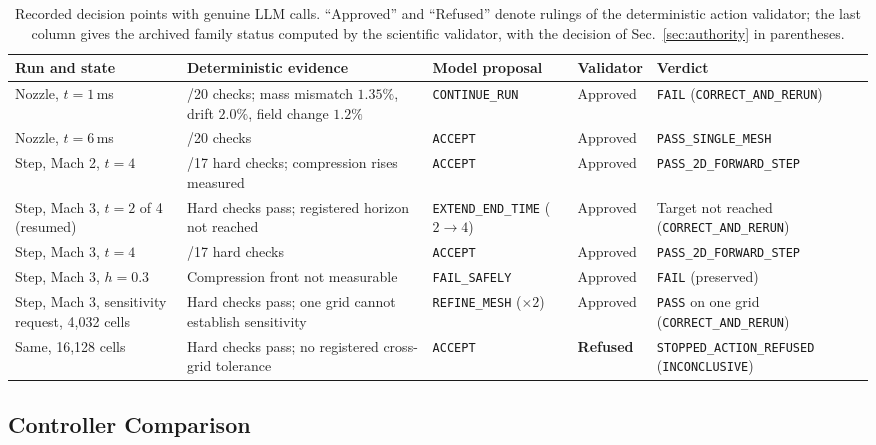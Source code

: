 \documentclass[11pt]{article}
\begin{document}
\begin{table}[!htbp]
\centering
\caption{Recorded decision points with genuine LLM calls.
``Approved'' and ``Refused'' denote rulings of the
deterministic action validator; the last column gives the archived family status computed
by the scientific validator, with the decision of Sec.~\ref{sec:authority}
in parentheses.}
\label{tab:actions}
\footnotesize
\setlength{\tabcolsep}{3pt}
\begin{tabularx}{\linewidth}{@{}>{\raggedright\arraybackslash}p{2.2cm}
  >{\raggedright\arraybackslash}X >{\raggedright\arraybackslash}p{2.55cm}
  >{\raggedright\arraybackslash}p{1.45cm} >{\raggedright\arraybackslash}p{3.3cm}@{}}
\toprule
Run and state & Deterministic evidence & Model proposal & Validator & Verdict \\
\midrule
Nozzle, $t=1$\,ms & 17/20 checks; mass mismatch $1.35\%$, drift $2.0\%$, field change $1.2\%$ & \texttt{CONTINUE\_RUN} & Approved & \texttt{FAIL} (\texttt{CORRECT\_AND\_\allowbreak RERUN}) \\
Nozzle, $t=6$\,ms & 20/20 checks & \texttt{ACCEPT} & Approved & \texttt{PASS\_SINGLE\_MESH} \\
Step, Mach 2, $t=4$ & 17/17 hard checks; compression rises measured & \texttt{ACCEPT} & Approved & \texttt{PASS\_2D\_FORWARD\_STEP} \\
Step, Mach 3, $t=2$ of 4 (resumed) & Hard checks pass; registered horizon not reached & \texttt{EXTEND\_END\_TIME} ($2\to4$) & Approved & Target not reached (\texttt{CORRECT\_AND\_\allowbreak RERUN}) \\
Step, Mach 3, $t=4$ & 17/17 hard checks & \texttt{ACCEPT} & Approved & \texttt{PASS\_2D\_FORWARD\_STEP} \\
Step, Mach 3, $h=0.3$ & Compression front not measurable & \texttt{FAIL\_SAFELY} & Approved & \texttt{FAIL} (preserved) \\
Step, Mach 3, sensitivity request, 4,032 cells & Hard checks pass; one grid cannot establish sensitivity & \texttt{REFINE\_MESH} ($\times2$) & Approved & \texttt{PASS} on one grid (\texttt{CORRECT\_AND\_\allowbreak RERUN}) \\
Same, 16,128 cells & Hard checks pass; no registered cross-grid tolerance & \texttt{ACCEPT} & \textbf{Refused} & \texttt{STOPPED\_ACTION\_\allowbreak REFUSED} (\texttt{INCONCLUSIVE}) \\
\bottomrule
\end{tabularx}
\end{table}


\subsection{Controller Comparison}
\label{sec:controller}
\end{document}
